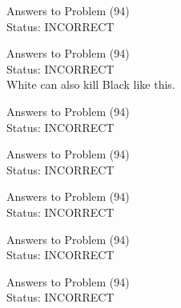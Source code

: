 \documentclass[11pt]{article}
\begin{document}
\begin{minipage}[t]{0.5\textwidth}
  {\centering
  
  Answers to Problem (94)\\
  Status: INCORRECT\\
  
  }
\end{minipage}
\begin{minipage}[t]{0.5\textwidth}
  {\centering
  
  Answers to Problem (94)\\
  Status: INCORRECT\\
  White can also kill Black like this.\\
  }
\end{minipage}
\begin{minipage}[t]{0.5\textwidth}
  {\centering
  
  Answers to Problem (94)\\
  Status: INCORRECT\\
  
  }
\end{minipage}
\begin{minipage}[t]{0.5\textwidth}
  {\centering
  
  Answers to Problem (94)\\
  Status: INCORRECT\\
  
  }
\end{minipage}
\begin{minipage}[t]{0.5\textwidth}
  {\centering
  
  Answers to Problem (94)\\
  Status: INCORRECT\\
  
  }
\end{minipage}
\begin{minipage}[t]{0.5\textwidth}
  {\centering
  
  Answers to Problem (94)\\
  Status: INCORRECT\\
  
  }
\end{minipage}
\begin{minipage}[t]{0.5\textwidth}
  {\centering
  
  Answers to Problem (94)\\
  Status: INCORRECT\\
  
  }
\end{minipage}
\end{document}
